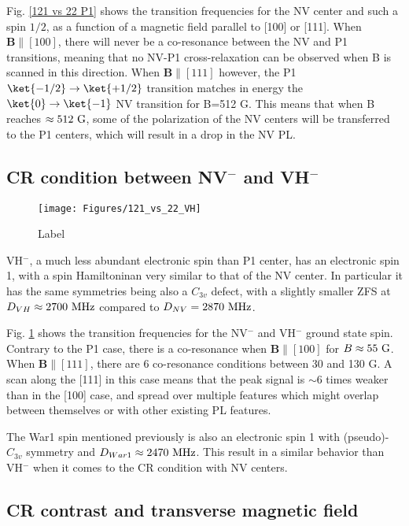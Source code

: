 \documentclass[a4paper]{report}
\begin{document}
Fig. \ref{121 vs 22 P1} shows the transition frequencies for the NV center and such a spin $1/2$, as a function of a magnetic field parallel to [100] or [111]. When $\mathbf{B} \parallel [100]$, there will never be a co-resonance between the NV and P1 transitions, meaning that no NV-P1 cross-relaxation can be observed when B is scanned in this direction. When $\mathbf{B} \parallel [111]$ however, the P1 $\ket{-1/2} \to \ket{+1/2}$ transition matches in energy the $\ket{0}\to\ket{-1}$ NV transition for B=512 G. This means that when B reaches $\approx 512\ \rm G$, some of the polarization of the NV centers will be transferred to the P1 centers, which will result in a drop in the NV PL. 

\subsection{CR condition between NV$^-$ and VH$^-$}

\begin{figure}[h]
\centering
\texttt{[image: Figures/121\_vs\_22\_VH]}
\caption{Label}
\label{121 vs 22 VH}
\end{figure}

VH$^-$, a much less abundant electronic spin than P1 center, has an electronic spin 1, with a spin Hamiltoninan very similar to that of the NV center. In particular it has the same symmetries being also a $C_{3v}$ defect, with a slightly smaller ZFS at $D_{VH} \approx 2700\ \rm MHz$ compared to $D_{NV}=2870\ \rm MHz$. 

Fig. \ref{121 vs 22 VH} shows the transition frequencies for the NV$^-$ and VH$^-$ ground state spin. Contrary to the P1 case, there is a co-resonance when $\mathbf{B} \parallel [100]$ for $B\approx 55\ \rm G$. When $\mathbf{B} \parallel [111]$, there are 6 co-resonance conditions between 30 and 130 G. A scan along the [111] in this case means that the peak signal is $\sim 6$ times weaker than in the [100] case, and spread over multiple features which might overlap between themselves or with other existing PL features.

The War1 spin mentioned previously is also an electronic spin 1 with (pseudo)-$C_{3v}$ symmetry and $D_{War1} \approx 2470\ \rm MHz$. This result in a similar behavior than VH$^-$ when it comes to the CR condition with NV centers.

\subsection{CR contrast and transverse magnetic field}
\end{document}
